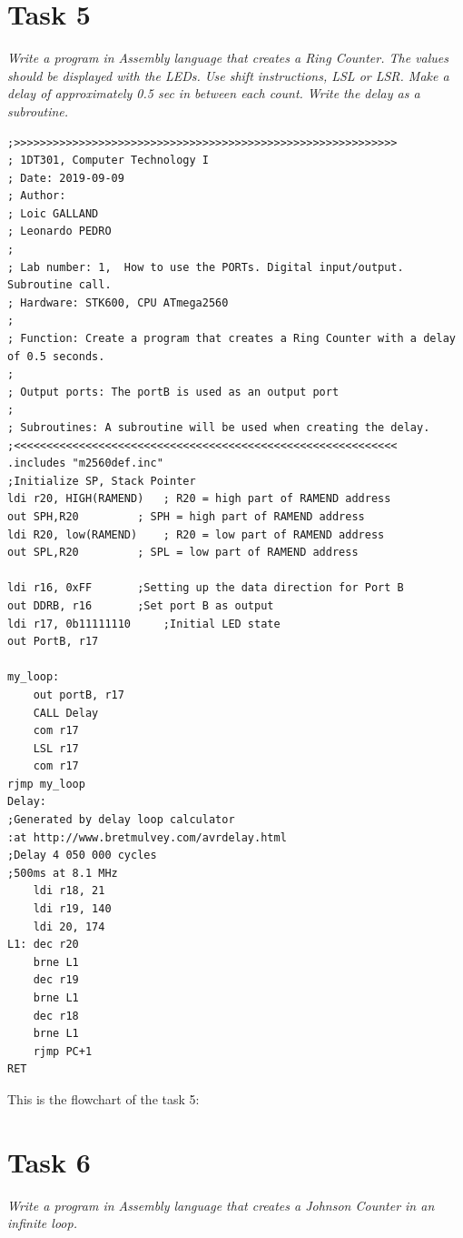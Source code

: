 \documentclass[a4paper,12pt]{article}
\begin{document}
\section{Task 5}
\textit{Write a program in Assembly language that creates a Ring Counter. The values should be
displayed with the LEDs. Use shift instructions, LSL or LSR.
Make a delay of approximately 0.5 sec in between each count. Write the delay as a
subroutine.}
\lstset{style=Asm}
\begin{lstlisting}
;>>>>>>>>>>>>>>>>>>>>>>>>>>>>>>>>>>>>>>>>>>>>>>>>>>>>>>>>>>>
; 1DT301, Computer Technology I
; Date: 2019-09-09
; Author:
; Loic GALLAND
; Leonardo PEDRO
;
; Lab number: 1,  How to use the PORTs. Digital input/output. Subroutine call.
; Hardware: STK600, CPU ATmega2560
;
; Function: Create a program that creates a Ring Counter with a delay of 0.5 seconds. 
;
; Output ports: The portB is used as an output port
;
; Subroutines: A subroutine will be used when creating the delay. 
;<<<<<<<<<<<<<<<<<<<<<<<<<<<<<<<<<<<<<<<<<<<<<<<<<<<<<<<<<<<
.includes "m2560def.inc"
;Initialize SP, Stack Pointer
ldi r20, HIGH(RAMEND)	; R20 = high part of RAMEND address
out SPH,R20 		; SPH = high part of RAMEND address
ldi R20, low(RAMEND) 	; R20 = low part of RAMEND address
out SPL,R20 		; SPL = low part of RAMEND address

ldi r16, 0xFF 		;Setting up the data direction for Port B
out DDRB, r16 		;Set port B as output
ldi r17, 0b11111110 	;Initial LED state
out PortB, r17

my_loop:
	out portB, r17
	CALL Delay
	com r17
	LSL r17
	com r17
rjmp my_loop
Delay:
;Generated by delay loop calculator
:at http://www.bretmulvey.com/avrdelay.html
;Delay 4 050 000 cycles
;500ms at 8.1 MHz
	ldi r18, 21
	ldi r19, 140
	ldi 20, 174
L1:	dec r20
	brne L1
	dec r19
	brne L1
	dec r18
	brne L1
	rjmp PC+1
RET
\end{lstlisting}
\newpage
This is the flowchart of the task 5:
\begin{center}
\end{center}
\newpage
\section{Task 6}
\textit{Write a program in Assembly language that creates a Johnson Counter in an infinite loop.}
\end{document}
